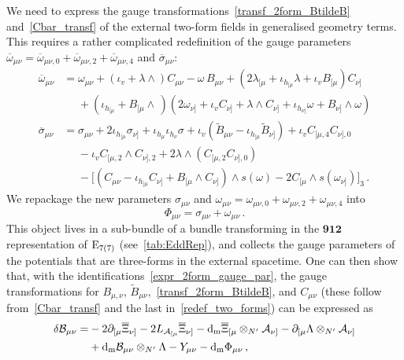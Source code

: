 \documentclass[debug]{phd}
\begin{document}
					We need to express the gauge transformations~\eqref{transf_2form_BtildeB} and~\eqref{Cbar_transf} of the external two-form fields in generalised geometry terms. 
					This requires a rather complicated redefinition of the gauge parameters $\overline{\omega}_{\mu\nu}= \overline{\omega}_{\mu\nu,0}+\overline{\omega}_{\mu\nu,2}+\overline{\omega}_{\mu\nu,4}$ and $\overline{\sigma}_{\mu\nu}$:
							\begin{equation}\label{expr_2form_gauge_par}
								\begin{split}
									\overline{\omega}_{\mu\nu} &= \omega_{\mu\nu} + (\iota_v+\lambda\wedge) C_{\mu\nu} - \omega\,B_{\mu\nu} + (2\lambda_{[\mu} + \iota_{h_{[\mu}}\lambda + \iota_v B_{[\mu})C_{\nu]} \\
														&\phantom{=} + (\iota_{h_{[\mu}} + B_{[\mu}\wedge\, )( 2\omega_{\nu]}+\iota_v C_{\nu]} + \lambda\wedge C_{\nu]} + \iota_{h_{\nu]}}\omega + B_{\nu]}\wedge \omega) \\[2mm]
									\overline{\sigma}_{\mu\nu} &= \sigma_{\mu\nu} + 2\iota_{h_{[\mu}}\sigma_{\nu]} +\iota_{h_\mu}\iota_{h_\nu}\sigma + \iota_v(\tilde{B}_{\mu\nu} - \iota_{h_{[\mu}}\tilde{B}_{\nu]}) + \iota_v C_{[\mu,4}C_{\nu],0} \\
														&\phantom{=} -\iota_v C_{[\mu,2}\wedge C_{\nu],2} + 2\lambda\wedge (C_{[\mu,2}C_{\nu],0}) \\
														&\phantom{=} - \big[(C_{\mu\nu} - \iota_{h_{[\mu}}C_{\nu]} + B_{[\mu}\wedge C_{\nu]})\wedge s(\omega) - 2C_{[\mu}\wedge s(\omega_{\nu]})\big]_3\,.
								\end{split}
							\end{equation}
					We repackage the new parameters $\sigma_{\mu\nu}$ and $\omega_{\mu\nu} = \omega_{\mu\nu,0} +\omega_{\mu\nu,2}+\omega_{\mu\nu,4}$ into
							\begin{equation}
								\Phi_{\mu\nu}= \sigma_{\mu\nu} + \omega_{\mu\nu}\,.
							\end{equation}
					This object lives in a sub-bundle of a bundle transforming in the $\mathbf{912}$ representation of $\mathrm{E}_{7(7)}$ (see~\cref{tab:EddRep}), and collects the gauge parameters of the potentials that are three-forms in the external spacetime. 
					One can then show that, with the identifications~\eqref{expr_2form_gauge_par}, the gauge transformations for $B_{\mu, \nu}$, $\tilde B_{\mu \nu}$,~\eqref{transf_2form_BtildeB}, and $C_{\mu\nu}$ (these follow from~\eqref{Cbar_transf} and the last in~\eqref{redef_two_forms}) can be expressed as
							\begin{equation}\label{delta_calB_munu}
								\begin{split}
									\delta \mathcal{B}_{\mu\nu} =& -2\partial_{[\mu} \overline{\Xi}_{\nu]} - 2 L_{\mathcal A_{[\mu}} \overline{\Xi}_{\nu]} - \mathrm{d}_{\mathrm{m}} \overline{\Xi}_{[\mu} \otimes_{N'} \mathcal{A}_{\nu]} - \partial_{[\mu} \Lambda \otimes_{N'} \mathcal{A}_{\nu]} \\
															& + \mathrm{d}_{\mathrm{m}} \mathcal{B}_{\mu\nu}\otimes_{N'} \Lambda - Y_{\mu\nu} - \mathrm{d}_{\mathrm{m}}\Phi_{\mu\nu}\,,
								\end{split}
							\end{equation}
\end{document}
